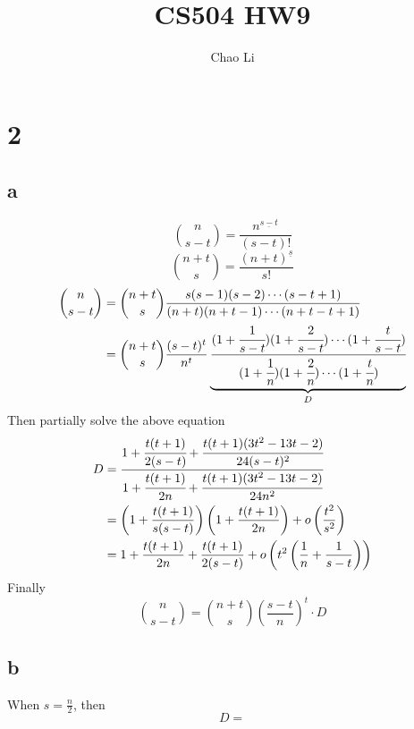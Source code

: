 \documentclass[11pt]{article}
\title{CS504 HW9}
\author{Chao Li}
\begin{document}
\maketitle
\section*{2}
\subsection*{a}
\[
\binom{n}{s-t}=\frac{n^{\underline{s-t}}}{(s-t)!}
\]
\[
\binom{n+t}{s}=\frac{(n+t)^{\underline{s}}}{s!}
\]
\begin{align*}
\binom{n}{s-t}&=\binom{n+t}{s}\frac{s(s-1)(s-2)\cdots (s-t+1)}{(n+t)(n+t-1)\cdots (n+t-t+1)} \\
              &=\binom{n+t}{s}\frac{(s-t)^t}{n^t}\underbrace{\cfrac{(1+\cfrac{1}{s-t})(1+\cfrac{2}{s-t})\cdots (1+\cfrac{t}{s-t})}{(1+\cfrac{1}{n})(1+\cfrac{2}{n})\cdots (1+\cfrac{t}{n})}}_{D} \\
\end{align*}
Then partially solve the above equation 
\begin{align*}
D&=\cfrac{1+\cfrac{t(t+1)}{2(s-t)}+\cfrac{t(t+1)(3t^2-13t-2)}{24(s-t)^2}}{1+\cfrac{t(t+1)}{2n}+\cfrac{t(t+1)(3t^2-13t-2)}{24n^2}} \\
 &=\left(1+\frac{t(t+1)}{s(s-t)}\right)\left(1+\frac{t(t+1)}{2n}\right)+o\left(\frac{t^2}{s^2}\right) \\
 &=1+\frac{t(t+1)}{2n}+\frac{t(t+1)}{2(s-t)}+o\left(t^2\left(\frac{1}{n}+\frac{1}{s-t}\right)\right)
\end{align*}
Finally
\[
\binom{n}{s-t}=\binom{n+t}{s}\left(\frac{s-t}{n}\right)^t\cdot D
\]
\subsection*{b}
When \(s=\frac{n}{2}\), then
\[
D=
\]
\end{document}
